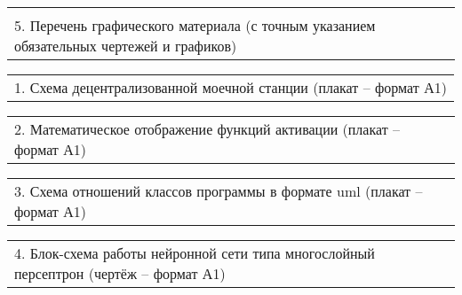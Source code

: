 \documentclass[12pt, А4, twoside]{article}
\begin{document}
\begin{FlushLeft}
		
		
		\begin{tabular}{p{17.25cm}}
			\vspace{0pt} \hline \\
			\textsf{5. Перечень графического материала (с точным указанием обязательных чертежей и графиков)} \vspace{0pt} \hline \\
		\end{tabular}
		
		\vspace{-0.1 cm}
		
		\begin{tabular}{p{17.25cm}}
			\hspace{0.3cm} \textsf{1. Схема децентрализованной моечной станции (плакат {--} формат А1)} \vspace{0pt} \hline  \\
		\end{tabular}
		
		\vspace{-0.1 cm}
		
		\begin{tabular}{p{17.25cm}}
			\hspace{0.3cm} \textsf{2. Математическое отображение функций активации (плакат {--} формат А1)} \vspace{0pt} \hline  \\
		\end{tabular}
		
		\vspace{-0.1 cm}
		
		\begin{tabular}{p{17.25cm}}
			\hspace{0.3cm} \textsf{3. Схема отношений классов программы в формате uml (плакат {--} формат А1)} \vspace{0pt} \hline  \\
		\end{tabular}
		
		\vspace{-0.1 cm}
		
		\begin{tabular}{p{17.25cm}}
			\hspace{0.3cm} \textsf{4. Блок-схема работы нейронной сети типа многослойный персептрон (чертёж {--} формат А1)} \vspace{0pt} \hline  \\
		\end{tabular}
		

\end{FlushLeft}
\end{document}

